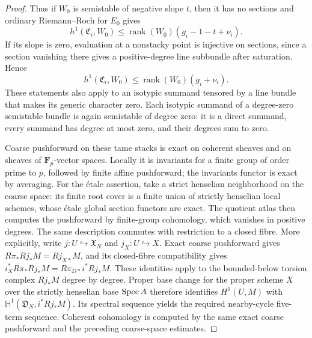 \begin{proof}
Thus if $W_0$ is semistable of negative slope $t$, then it has no
sections and ordinary Riemann--Roch for $E_0$ gives
\[
 h^1(\mathfrak C_i,W_0)
 \leq \operatorname{rank}(W_0)(g_i-1-t+\nu_i).
 \tag{F8.4}
\]
If its slope is zero, evaluation at a nonstacky point is injective
on sections, since a section vanishing there gives a positive-degree
line subbundle after saturation. Hence
\[
 h^1(\mathfrak C_i,W_0)
 \leq \operatorname{rank}(W_0)(g_i+\nu_i).
 \tag{F8.5}
\]
These statements also apply to an isotypic summand tensored by a
line bundle that makes its generic character zero. Each isotypic
summand of a degree-zero semistable bundle is again semistable of
degree zero: it is a direct summand, every summand has degree at
most zero, and their degrees sum to zero.

Coarse pushforward on these tame stacks is exact on coherent
sheaves and on sheaves of $\mathbf F_p$-vector spaces. Locally it
is invariants for a finite group of order prime to $p$, followed
by finite affine pushforward; the invariants functor is exact by
averaging. For the \'etale assertion, take a strict henselian
neighborhood on the coarse space: its finite root cover is a finite
union of strictly henselian local schemes, whose \'etale global
section functors are exact. The quotient atlas then computes the
pushforward by finite-group cohomology, which vanishes in positive
degrees. The same description commutes with restriction to a closed
fibre. More explicitly, write $j:U\hookrightarrow\mathfrak X_N$ and
$j_X:U\hookrightarrow X$. Exact coarse pushforward gives
$R\pi_*Rj_*M=Rj_{X*}M$, and its closed-fibre compatibility gives
$i_X^*R\pi_*Rj_*M=R\pi_{D*}i^*Rj_*M$. These identities apply
to the bounded-below torsion complex $Rj_*M$ degree by degree.
Proper base change for the proper scheme $X$ over the strictly
henselian base $\operatorname{Spec} A$ therefore identifies
$H^1(U,M)$ with $\mathbb H^1(\mathfrak D_N,i^*Rj_*M)$.
Its spectral sequence yields the required nearby-cycle five-term
sequence. Coherent cohomology is computed by the same exact
coarse pushforward and the preceding coarse-space estimates.


\end{proof}
